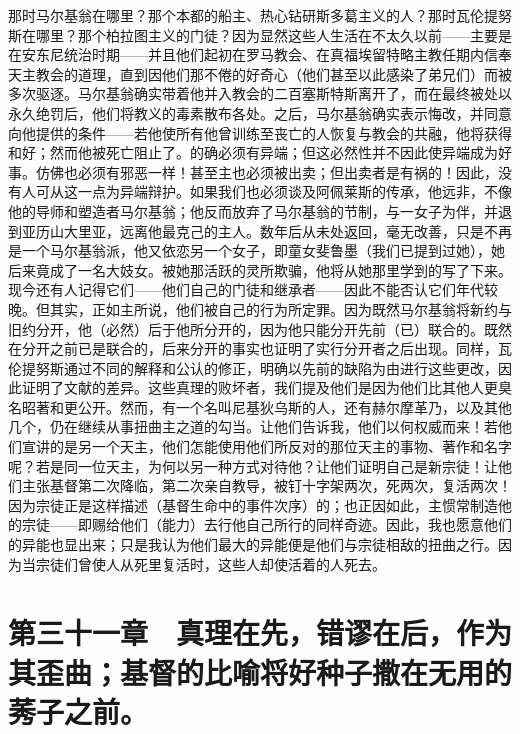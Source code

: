 那时马尔基翁在哪里？那个本都的船主、热心钻研斯多葛主义的人？那时瓦伦提努斯在哪里？那个柏拉图主义的门徒？因为显然这些人生活在不太久以前——主要是在安东尼统治时期——并且他们起初在罗马教会、在真福埃留特略主教任期内信奉天主教会的道理，直到因他们那不倦的好奇心（他们甚至以此感染了弟兄们）而被多次驱逐。马尔基翁确实带着他并入教会的二百塞斯特斯离开了，而在最终被处以永久绝罚后，他们将教义的毒素散布各处。之后，马尔基翁确实表示悔改，并同意向他提供的条件——若他使所有他曾训练至丧亡的人恢复与教会的共融，他将获得和好；然而他被死亡阻止了。的确必须有异端；但这必然性并不因此使异端成为好事。仿佛也必须有邪恶一样！甚至主也必须被出卖；但出卖者是有祸的！因此，没有人可从这一点为异端辩护。如果我们也必须谈及阿佩莱斯的传承，他远非，不像他的导师和塑造者马尔基翁；他反而放弃了马尔基翁的节制，与一女子为伴，并退到亚历山大里亚，远离他最克己的主人。数年后从未处返回，毫无改善，只是不再是一个马尔基翁派，他又依恋另一个女子，即童女斐鲁墨（我们已提到过她），她后来竟成了一名大妓女。被她那活跃的灵所欺骗，他将从她那里学到的写了下来。现今还有人记得它们——他们自己的门徒和继承者——因此不能否认它们年代较晚。但其实，正如主所说，他们被自己的行为所定罪。因为既然马尔基翁将新约与旧约分开，他（必然）后于他所分开的，因为他只能分开先前（已）联合的。既然在分开之前已是联合的，后来分开的事实也证明了实行分开者之后出现。同样，瓦伦提努斯通过不同的解释和公认的修正，明确以先前的缺陷为由进行这些更改，因此证明了文献的差异。这些真理的败坏者，我们提及他们是因为他们比其他人更臭名昭著和更公开。然而，有一个名叫尼基狄乌斯的人，还有赫尔摩革乃，以及其他几个，仍在继续从事扭曲主之道的勾当。让他们告诉我，他们以何权威而来！若他们宣讲的是另一个天主，他们怎能使用他们所反对的那位天主的事物、著作和名字呢？若是同一位天主，为何以另一种方式对待他？让他们证明自己是新宗徒！让他们主张基督第二次降临，第二次亲自教导，被钉十字架两次，死两次，复活两次！因为宗徒正是这样描述（基督生命中的事件次序）的；也正因如此，主惯常制造他的宗徒——即赐给他们（能力）去行他自己所行的同样奇迹。因此，我也愿意他们的异能也显出来；只是我认为他们最大的异能便是他们与宗徒相敌的扭曲之行。因为当宗徒们曾使人从死里复活时，这些人却使活着的人死去。\par


\section{第三十一章　真理在先，错谬在后，作为其歪曲；基督的比喻将好种子撒在无用的莠子之前。}

